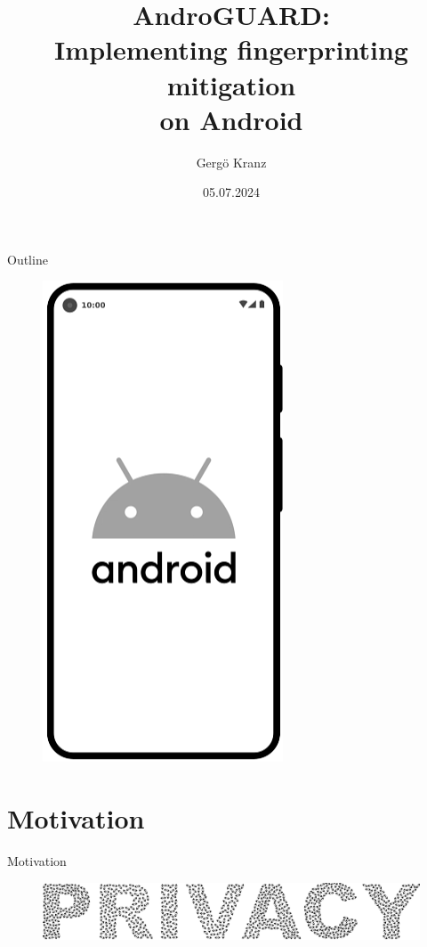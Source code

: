 \documentclass[aspectratio=169]{beamer}
[aspectratio=169] %
\title[AndroGUARD]{AndroGUARD: \\Implementing fingerprinting mitigation\\on Android}
\author{Gergö Kranz}
\date{05.07.2024}
\institute{IAIK}
\begin{document}
\begin{frame}[plain]
  \maketitle
\end{frame}


\begin{frame}{Outline}
  \begin{minipage}{0.49\textwidth} 
    \tableofcontents
  \end{minipage}
  \hfill
  \begin{minipage}{0.49\textwidth} 
    \begin{figure}
      \centering
      \includegraphics[height=0.5\textheight]{figures/android_device.png}
    \end{figure}
  \end{minipage}
\end{frame}


\section{Motivation}

\begin{frame}{Motivation}
  \hfill \hfill \hfill \hfill \hfill \hfill \hfill
  \begin{figure}
    \centering
    \includegraphics[width=\textwidth]{figures/eyes.png}
  \end{figure}
\end{frame}
\end{document}
